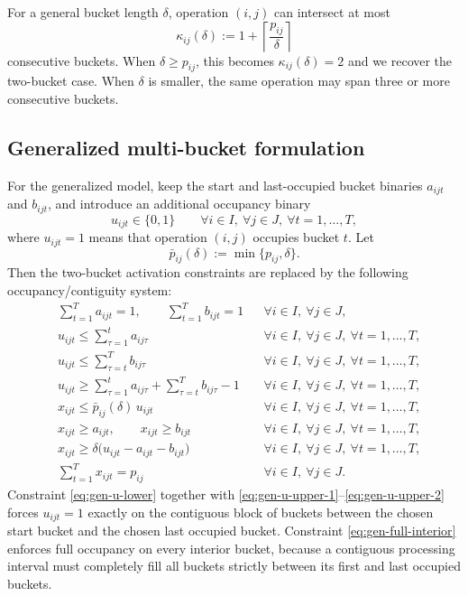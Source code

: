 \documentclass[11pt]{article}
\begin{document}
For a general bucket length $\delta$, operation $(i,j)$ can intersect at most
\[
\kappa_{ij}(\delta):=1+\left\lceil\frac{p_{ij}}{\delta}\right\rceil
\]
consecutive buckets.
When $\delta\ge p_{ij}$, this becomes $\kappa_{ij}(\delta)=2$ and we recover the two-bucket case.
When $\delta$ is smaller, the same operation may span three or more consecutive buckets.

\subsection{Generalized multi-bucket formulation}

For the generalized model, keep the start and last-occupied bucket binaries $a_{ijt}$ and $b_{ijt}$, and introduce an additional occupancy binary
\[
u_{ijt}\in\{0,1\}
\qquad \forall i\in I,\ \forall j\in J,\ \forall t=1,\dots,T,
\]
where $u_{ijt}=1$ means that operation $(i,j)$ occupies bucket $t$.
Let
\[
\bar p_{ij}(\delta):=\min\{p_{ij},\delta\}.
\]
Then the two-bucket activation constraints are replaced by the following occupancy/contiguity system:
\begin{subequations}\label{eq:general-occ}
\begin{align}
& \sum_{t=1}^{T} a_{ijt}=1,
\qquad
  \sum_{t=1}^{T} b_{ijt}=1
&& \forall i\in I,\ \forall j\in J,
\label{eq:gen-start-end}\\
& u_{ijt} \le \sum_{\tau=1}^{t} a_{ij\tau}
&& \forall i\in I,\ \forall j\in J,\ \forall t=1,\dots,T,
\label{eq:gen-u-upper-1}\\
& u_{ijt} \le \sum_{\tau=t}^{T} b_{ij\tau}
&& \forall i\in I,\ \forall j\in J,\ \forall t=1,\dots,T,
\label{eq:gen-u-upper-2}\\
& u_{ijt} \ge \sum_{\tau=1}^{t} a_{ij\tau} + \sum_{\tau=t}^{T} b_{ij\tau} -1
&& \forall i\in I,\ \forall j\in J,\ \forall t=1,\dots,T,
\label{eq:gen-u-lower}\\
& x_{ijt} \le \bar p_{ij}(\delta)\,u_{ijt}
&& \forall i\in I,\ \forall j\in J,\ \forall t=1,\dots,T,
\label{eq:gen-x-upper}\\
& x_{ijt} \ge a_{ijt},
\qquad
  x_{ijt} \ge b_{ijt}
&& \forall i\in I,\ \forall j\in J,\ \forall t=1,\dots,T,
\label{eq:gen-x-pos}\\
& x_{ijt} \ge \delta\bigl(u_{ijt}-a_{ijt}-b_{ijt}\bigr)
&& \forall i\in I,\ \forall j\in J,\ \forall t=1,\dots,T,
\label{eq:gen-full-interior}\\
& \sum_{t=1}^{T} x_{ijt}=p_{ij}
&& \forall i\in I,\ \forall j\in J.
\label{eq:gen-proc-conservation}
\end{align}
\end{subequations}
Constraint \eqref{eq:gen-u-lower} together with \eqref{eq:gen-u-upper-1}--\eqref{eq:gen-u-upper-2} forces $u_{ijt}=1$ exactly on the contiguous block of buckets between the chosen start bucket and the chosen last occupied bucket.
Constraint \eqref{eq:gen-full-interior} enforces full occupancy on every interior bucket, because a contiguous processing interval must completely fill all buckets strictly between its first and last occupied buckets.
\end{document}
